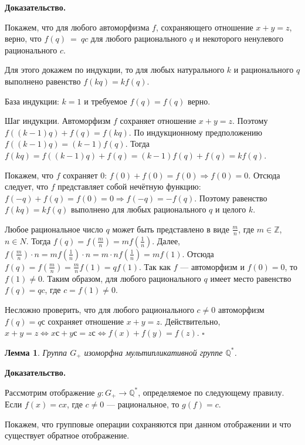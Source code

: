 \documentclass[12pt]{article}
\newtheorem{lemma}[theorem]{{\indent \bf Лемма}}
\theoremstyle{definition}
\begin{document}
    \textbf{Доказательство.}
    
    Покажем, что для любого автоморфизма $ f $, сохраняющего отношение $ x + y = z $, верно, что $ f(q)~=~qc $ для любого рационального $ q $ и некоторого ненулевого рационального $ c $.
    
    Для этого докажем по индукции, то для любых натурального $ k $ и рационального $ q $ выполнено равенство $ f(kq) = kf(q) $.
    
    База индукции: $ k = 1 $ и требуемое $ f(q) = f(q) $ верно.
    
    Шаг индукции. Автоморфизм $ f $ сохраняет отношение $ x + y = z $. Поэтому $ f((k-1)q) + f(q) = f(kq) $. По индукционному предположению $ f((k-1)q) = (k-1)f(q) $. Тогда $ f(kq) = f((k-1)q) + f(q) = (k-1)f(q) + f(q) = kf(q) $.
    
    Покажем, что $ f $ сохраняет 0: $ f(0) + f(0) = f(0) \Longrightarrow f(0)=0  $. Отсюда следует, что $ f $ представляет собой нечётную функцию: $ f(-q) + f(q) = f(0) = 0  \Longrightarrow f(-q) = -f(q)$. Поэтому равенство $ f(kq) = kf(q) $ выполнено для любых рационального $ q $ и целого $ k $.
    
    Любое рациональное число $ q $ может быть представлено в виде $ \frac{m}{n} $, где $ m \in \mathbb{Z} $, $ n \in N $. Тогда $ f(q) = f(\frac{m}{n}) = mf(\frac{1}{n}) $. Далее, $ f(\frac{m}{n}) \cdot n = mf(\frac{1}{n}) \cdot n = m \cdot nf(\frac{1}{n}) = mf(1) $. Отсюда $ f(q) =  f(\frac{m}{n}) = \frac{m}{n}f(1) = qf(1) $. Так как $ f $ --- автоморфизм и $ f(0) = 0 $, то $ f(1) \neq 0 $. Таким образом, для любого рационального $ q $ имеет место равенство $ f(q) = qc $, где $ c = f(1) \neq 0 $.
    
    Несложно проверить, что для любого рационального $ c \neq 0 $ автоморфизм $ f(q) = qс $ сохраняет отношение $ x + y = z $. Действительно, $ x + y = z \Longleftrightarrow xс + yс = zс \Longleftrightarrow f(x) + f(y) = f(z) $.
    $ \square $
    
    \begin{lemma}
    	Группа $ G_{+} $ изоморфна мультипликативной группе $ \mathbb{Q}^* $.
    \end{lemma}
    
    \textbf{Доказательство.}
    
    Рассмотрим отображение $ g \colon G_{+} \longrightarrow \mathbb{Q}^* $, определяемое по следующему правилу. Если $ f(x) = cx $, где $ c \neq 0 $ --- рациональное, то $ g(f) = c $.
    
    Покажем, что групповые операции сохраняются при данном отображении и что существует обратное отображение. 
    
\end{document}
